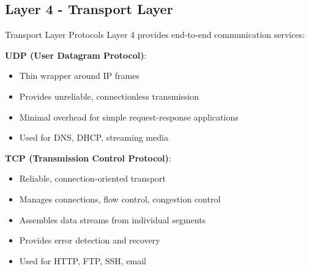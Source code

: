 \multend



\raggedcolumns
\columnbreak

\subsection{Layer 4 - Transport Layer}

\begin{definition}{Transport Layer Protocols}
    Layer 4 provides end-to-end communication services:
    \vspace{2mm}\\

    \begin{minipage}{0.5\linewidth}
   \textbf{UDP (User Datagram Protocol)}:
            \begin{itemize}
                \item Thin wrapper around IP frames
                \item Provides unreliable, connectionless transmission
                \item Minimal overhead for simple request-response applications
                \item Used for DNS, DHCP, streaming media
            \end{itemize}
    \end{minipage}
    \begin{minipage}{0.5\linewidth}
        \textbf{TCP (Transmission Control Protocol)}:
            \begin{itemize}
                \item Reliable, connection-oriented transport
                \item Manages connections, flow control, congestion control
                \item Assembles data streams from individual segments
                \item Provides error detection and recovery
                \item Used for HTTP, FTP, SSH, email
            \end{itemize}
    \end{minipage}

\end{definition}

